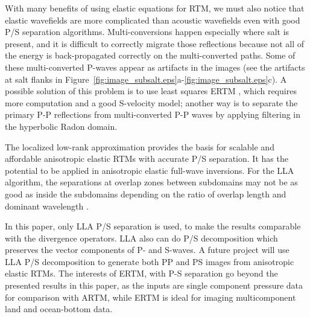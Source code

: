 \documentclass[manuscript,ulem,graphix,revised]{geophysics}
\begin{document}

With many benefits of using elastic equations for RTM, we must also notice that elastic wavefields are more complicated than acoustic wavefields even with good P/S separation algorithms. Multi-conversions happen especially where salt is present, and it is difficult to correctly migrate those reflections because not all of the energy is back-propagated correctly on the multi-converted paths. Some of these multi-converted P-waves appear as artifacts in the images (see the artifacts at salt flanks in Figure~\ref{fig:image_subsalt.eps}a-\ref{fig:image_subsalt.eps}c). 
A possible solution of this problem is to use least squares ERTM \citep{duan16}, which requires more computation and a good S-velocity model; 
another way is to separate the primary P-P reflections from multi-converted P-P waves by applying filtering in the hyperbolic Radon domain.

The localized low-rank approximation provides the basis for scalable and affordable anisotropic elastic RTMs with accurate P/S separation. It has the potential to be applied in anisotropic elastic full-wave inversions. For the LLA algorithm, the separations at overlap zones between subdomains may not be as good as inside the subdomains depending on the ratio of overlap length and dominant wavelength \citep{wenlong17}. 

In this paper, only LLA P/S separation is used, to make the results comparable with the divergence operators. LLA also can do P/S decomposition which preserves the vector components of P- and S-waves. A future project will use LLA P/S decomposition to generate both PP and PS images from anisotropic elastic RTMs. The interests of ERTM, with P-S separation go beyond the presented results in this paper, as the inputs are single component pressure data for comparison with ARTM, while ERTM is ideal for imaging multicomponent land and ocean-bottom data.
\end{document}
